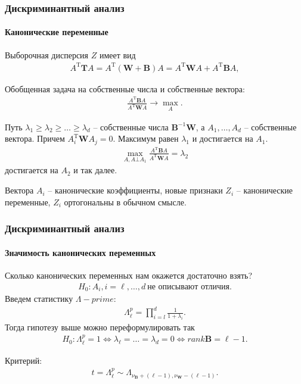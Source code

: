 \documentclass{beamer}
\begin{document}
\begin{frame}
  \frametitle{Дискриминантный анализ}
  \framesubtitle{Канонические переменные}
  Выборочная дисперсия $Z$ имеет вид
  \begin{align*}
  A^\mathrm{T}\mathbf{T}A = A^\mathrm{T}(\mathbf{W} + \mathbf{B})A = A^\mathrm{T}\mathbf{W}A + A^\mathrm{T}\mathbf{B}A,
  \end{align*}

  Обобщенная задача на собственные числа и собственные вектора:
  \begin{align*}
    \frac{A^\mathrm{T}\mathbf{B}A}{A^\mathrm{T}\mathbf{W}A} \rightarrow \max_{A}.
  \end{align*}

  Путь $\lambda_1 \geq \lambda_2 \geq \ldots \geq \lambda_d$ -- собственные числа $\mathbf{B}^{-1}\mathbf{W}$, а $A_1, \ldots, A_d$ -- собственные вектора. Причем $A^\mathrm{T}_i \mathbf{W}A_j = 0$. Максимум равен $\lambda_1$  и достигается на $A_1$.
  \begin{align*}
    \max_{A, A \bot A_1}\frac{A^\mathrm{T}\mathbf{B}A}{A^\mathrm{T}\mathbf{W}A} = \lambda_2
  \end{align*}
  достигается на $A_2$ и так далее.

  Вектора $A_i$ -- канонические коэффициенты, новые признаки $Z_i$ -- канонические переменные, $Z_i$ ортогональны в обычном смысле.
\end{frame}
\begin{frame}
  \frametitle{Дискриминантный анализ}
  \framesubtitle{Значимость канонических переменных}
  Сколько канонических переменных нам окажется достаточно взять?
  \begin{align*}
    H_0: A_i, i = \ell,\ldots,d~\text{не описывают отличия}.
  \end{align*}
  Введем статистику $\Lambda-prime$:
  \begin{align*}
  \Lambda_\ell^p = \prod_{i = l}^d \frac{1}{1 + \lambda_i}.
  \end{align*}
  Тогда гипотезу выше можно переформулировать так
  \begin{align*}
  H_0: \Lambda_\ell^p = 1 \Leftrightarrow \lambda_\ell = \ldots = \lambda_d = 0 \Leftrightarrow rank \mathbf{B} = \ell - 1.
  \end{align*}

  Критерий:
  \begin{align*}
  t = \Lambda_{\ell}^{p} \sim \Lambda_{\nu_\mathbf{B} + (\ell - 1), \nu_\mathbf{W} - (\ell - 1)}.
  \end{align*}
\end{frame}
\end{document}
